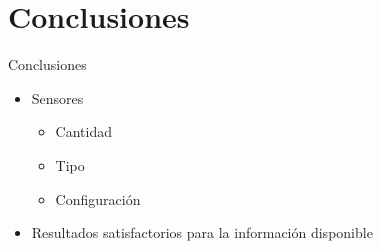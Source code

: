 \documentclass[spanish]{beamer}
\begin{document}
\section[Outline]{Conclusiones}

\begin{frame}{Conclusiones}
  \begin{itemize}
  \item Sensores
    \begin{itemize}
    \item Cantidad
    \item Tipo
    \item Configuración
    \end{itemize}
  \item Resultados satisfactorios para la información disponible
  \end{itemize}
\end{frame}
\end{document}
